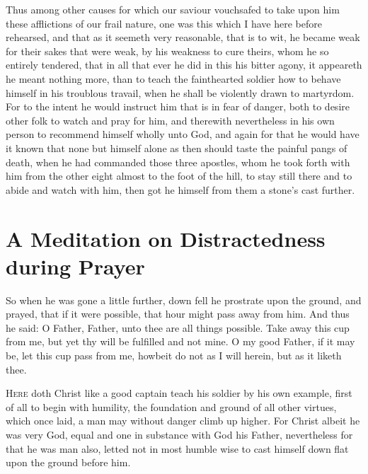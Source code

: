 \documentclass[a5paper]{scrbook}
\begin{document}
	Thus among other causes for which our saviour vouchsafed to take upon him these afflictions of our frail nature, one was this which I have here before rehearsed, and that as it seemeth very reasonable, that is to wit, he became weak for their sakes that were weak, by his weakness to cure theirs, whom he so entirely tendered, that in all that ever he did in this his bitter agony, it appeareth he meant nothing more, than to teach the fainthearted soldier how to behave himself in his troublous travail, when he shall be violently drawn to martyrdom. For to the intent he would instruct him that is in fear of danger, both to desire other folk to watch and pray for him, and therewith nevertheless in his own person to recommend himself wholly unto God, and again for that he would have it known that none but himself alone as then should taste the painful pangs of death, when he had commanded those three apostles, whom he took forth with him from the other eight almost to the foot of the hill, to stay still there and to abide and watch with him, then got he himself from them a stone's cast further.
	
	\chapter{A Meditation on Distractedness during Prayer}
	
	\begin{scripture}[Mt 26:39, Mk 14:35-36]
		So when he was gone a little further, down fell he prostrate upon the ground, and prayed, that if it were possible, that hour might pass away from him. And thus he said: O Father, Father, unto thee are all things possible. Take away this cup from me, but yet thy will be fulfilled and not mine. O my good Father, if it may be, let this cup pass from me, howbeit do not as I will herein, but as it liketh thee.
	\end{scripture}
	
	\vspace{10mm}
	
	\lettrine{H}{ere} doth Christ like a good captain teach his soldier by his own example, first of all to begin with humility, the foundation and ground of all other virtues, which once laid, a man may without danger climb up higher. For Christ albeit he was very God, equal and one in substance with God his Father, nevertheless for that he was man also, letted not in most humble wise to cast himself down flat upon the ground before him.
	
\end{document}
